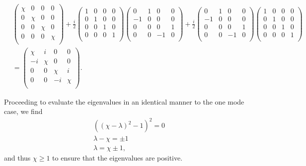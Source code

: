 \documentclass[11pt,a4paper]{article}
\numberwithin{equation}{section}
\begin{document}
	\begin{align*}
	&\begin{pmatrix}
	\chi & 0 & 0 & 0\\
	0 & \chi & 0 & 0\\
	0 & 0 & \chi & 0 \\
	0 & 0 & 0 & \chi\\
	\end{pmatrix} + \frac{i}{2}\begin{pmatrix}
	1 & 0 & 0 & 0\\
	0 & 1 & 0 & 0\\
	0 & 0 & 1 & 0 \\
	0 & 0 & 0 & 1\\
	\end{pmatrix}\begin{pmatrix}
	0 & 1 & 0 & 0 \\
	-1 & 0 & 0 & 0\\
	0 & 0 & 0 & 1\\
	0 & 0 & -1 & 0\\
	\end{pmatrix} + \frac{i}{2}\begin{pmatrix}
	0 & 1 & 0 & 0 \\
	-1 & 0 & 0 & 0\\
	0 & 0 & 0 & 1\\
	0 & 0 & -1 & 0\\
	\end{pmatrix}\begin{pmatrix}
	1 & 0 & 0 & 0\\
	0 & 1 & 0 & 0\\
	0 & 0 & 1 & 0 \\
	0 & 0 & 0 & 1\\
	\end{pmatrix}&\\
	&=\begin{pmatrix}
	\chi & i & 0 & 0 \\
	-i & \chi & 0 & 0\\
	0 & 0 & \chi & i\\
	0 & 0 & -i & \chi\\
	\end{pmatrix}.
	\end{align*}
	
	Proceeding to evaluate the eigenvalues in an identical manner to the one mode case, we find
	\begin{align*}
    &((\chi-\lambda)^2 - 1)^2=0&\\
        &\lambda-\chi=\pm1&\\
	&\lambda = \chi \pm 1,&
	\end{align*}
	and thus $\chi \geq 1$ to ensure that the eigenvalues are positive.
	
\end{document}

